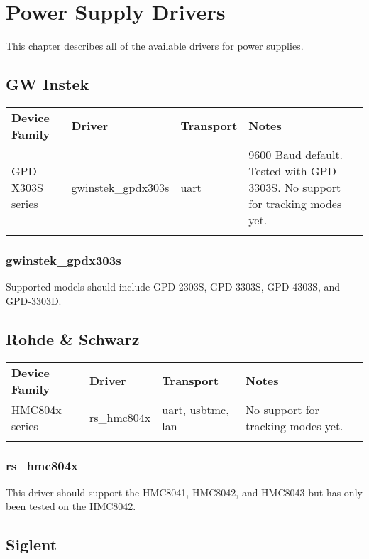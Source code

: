 \chapter{Power Supply Drivers}
\label{sec:powersupply-drivers}

This chapter describes all of the available drivers for power supplies.

\section{GW Instek}

\begin{tabularx}{16cm}{lllX}
\thickhline
\textbf{Device Family} & \textbf{Driver} & \textbf{Transport} & \textbf{Notes} \\
\thickhline
GPD-X303S series & gwinstek\_gpdx303s & uart & 9600 Baud default. Tested with GPD-3303S. No support for tracking modes yet.\\
\thickhline
\end{tabularx}

\subsection{gwinstek\_gpdx303s}

Supported models should include GPD-2303S, GPD-3303S, GPD-4303S, and GPD-3303D.

\section{Rohde \& Schwarz}

\begin{tabularx}{16cm}{lllX}
\thickhline
\textbf{Device Family} & \textbf{Driver} & \textbf{Transport} & \textbf{Notes} \\
\thickhline
HMC804x series & rs\_hmc804x & uart, usbtmc, lan & No support for tracking modes yet.\\
\thickhline
\end{tabularx}

\subsection{rs\_hmc804x}

This driver should support the HMC8041, HMC8042, and HMC8043 but has only been tested on the HMC8042.

\section{Siglent}

